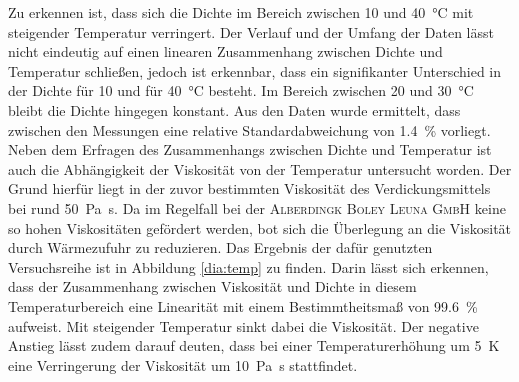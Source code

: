 \FloatBarrier 

Zu erkennen ist, dass sich die Dichte im Bereich zwischen 10 und \SI{40}{\celsius} mit steigender Temperatur verringert. Der Verlauf und der Umfang der Daten lässt nicht eindeutig auf einen linearen Zusammenhang zwischen Dichte und Temperatur schließen, jedoch ist erkennbar, dass ein signifikanter Unterschied in der Dichte für 10 und für \SI{40}{\celsius} besteht. Im Bereich zwischen 20 und \SI{30}{\celsius} bleibt die Dichte hingegen konstant. Aus den Daten wurde ermittelt, dass zwischen den Messungen eine relative Standardabweichung von \SI{1,4}{\percent} vorliegt.\linebreak
Neben dem Erfragen des Zusammenhangs zwischen Dichte und Temperatur ist auch die Abhängigkeit der Viskosität von der Temperatur untersucht worden. Der Grund hierfür liegt in der zuvor bestimmten Viskosität des Verdickungsmittels bei rund \SI{50}{\pascal \second}. Da im Regelfall bei der \textsc{Alberdingk Boley Leuna GmbH} keine so hohen Viskositäten gefördert werden, bot sich die Überlegung an die Viskosität durch Wärmezufuhr zu reduzieren. Das Ergebnis der dafür genutzten Versuchsreihe ist in Abbildung \ref{dia:temp} zu finden. Darin lässt sich erkennen, dass der Zusammenhang zwischen Viskosität und Dichte in diesem Temperaturbereich eine Linearität mit einem Bestimmtheitsmaß von \SI{99,6}{\percent} aufweist. Mit steigender Temperatur sinkt dabei die Viskosität. Der negative Anstieg lässt zudem darauf deuten, dass bei einer Temperaturerhöhung um \SI{5}{\kelvin} eine Verringerung der Viskosität um \SI{10}{\pascal \second} stattfindet.


